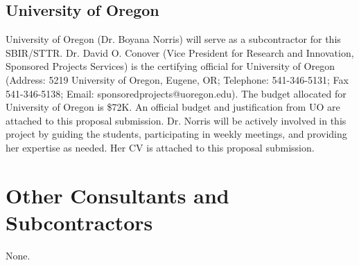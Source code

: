 
\subsection{University of Oregon}

University of Oregon (Dr. Boyana Norris) will serve as a subcontractor for this SBIR/STTR.
Dr. David O. Conover (Vice President for Research and Innovation, Sponsored Projects Services) is the
certifying official for University of Oregon (Address: 5219 University of Oregon, Eugene, OR;
Telephone: 541-346-5131; Fax 541-346-5138; Email: sponsoredprojects@uoregon.edu). The budget allocated
for University of Oregon is \$72K. An official budget and justification from UO are attached to
this proposal submission. Dr. Norris will be actively involved in this project by guiding the students,
participating in weekly meetings, and providing her expertise as needed. Her CV is attached to this
proposal submission.

\section{Other Consultants and Subcontractors}
None.
